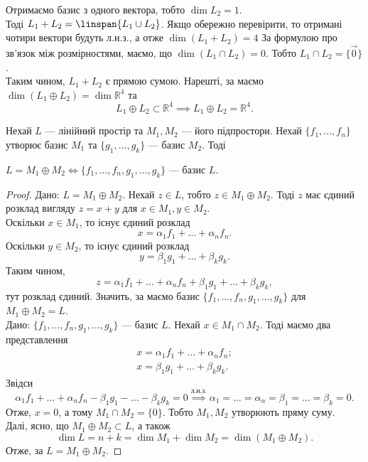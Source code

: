 \documentclass{math_library}
\begin{document}
\begin{example}
\[	\]
	Отримаємо базис з одного вектора, тобто $\dim L_2 = 1$.\\
	Тоді $L_1 + L_2 = \linspan\{L_1 \cup L_2\}$. Якщо обережно перевірити, то отримані чотири вектори будуть л.н.з., а отже $\dim (L_1 + L_2) = 4$ За формулою про зв'язок між розмірностями, маємо, що $\dim{(L_1 \cap L_2)} = 0$. Тобто $L_1 \cap L_2 = \{ \vec{0} \}$.\\
	Таким чином, $L_1 + L_2$ є прямою сумою. Нарешті, за  маємо $\dim{(L_1  \oplus  L_2)} = \dim {\mathbb{R}^4}$ та 
	\[
	L_1  \oplus  L_2 \subset \mathbb{R}^4 \implies L_1  \oplus  L_2 = \mathbb{R}^4.
	\]
	\end{example}
	
	\begin{theorem}
	\label{direct_sum_iff_union_of_bases_is_basis}
	Нехай $L$ --- лінійний простір та $M_1,M_2$ --- його підпростори. Нехай $\{f_1,\dots,f_n\}$ утворює базис $M_1$ та $\{g_1,\dots,g_k\}$ --- базис $M_2$. Тоді
	\begin{center}
	$L = M_1  \oplus  M_2 \iff \{f_1,\dots,f_n,g_1,\dots,g_k\}$ --- базис $L$.
	\end{center}
	\end{theorem}
	
	\begin{proof}
	\rightproof Дано: $L = M_1  \oplus  M_2$. Нехай $z \in L$, тобто $z \in M_1  \oplus  M_2$. Тоді $z$ має єдиний розклад вигляду $z = x+y$ для $x \in M_1, y \in M_2$.\\
	Оскільки $x \in M_1$, то існує єдиний розклад 
	\[
	x = \alpha_1 f_1 + \dots + \alpha_n f_n.
	\]
	Оскільки $y \in M_2$, то існує єдиний розклад
	\[
	y = \beta_1 g_1 + \dots + \beta_k g_k.
	\]
	Таким чином, 
	\[
	z = \alpha_1 f_1 + \dots + \alpha_n f_n + \beta_1 g_1 + \dots + \beta_k g_k,
	\]
	тут розклад єдиний. Значить, за  маємо базис $\{f_1,\dots,f_n,g_1,\dots,g_k\}$ для $M_1  \oplus  M_2 = L$. 
	\bigskip \\
	\leftproof Дано: $\{f_1,\dots,f_n,g_1,\dots,g_k\}$ --- базис $L$.
	Нехай $x \in M_1 \cap M_2$. Тоді маємо два представлення
	\begin{align*}
	x = \alpha_1 f_1 + \dots + \alpha_n f_n; \\
	x = \beta_1 g_1 + \dots + \beta_k g_k.
	\end{align*}
	Звідси 
	\[
	\alpha_1 f_1 + \dots + \alpha_n f_n - \beta_1 g_1 - \dots - \beta_k g_k = 0 \overset{\text{л.н.з.}}{\implies} \alpha_1 = \dots = \alpha_n = \beta_1 = \dots = \beta_k = 0.
	\]
	Отже, $x = 0$, а тому $M_1 \cap M_2 = \{0\}$. Тобто $M_1,M_2$ утворюють пряму суму.\\
	Далі, ясно, що $M_1  \oplus  M_2 \subset L$, а також 
	\[
	\dim L = n+k = \dim M_1 + \dim M_2 = \dim (M_1  \oplus  M_2).
	\]
	Отже, за  $L = M_1  \oplus  M_2$.
	\end{proof}
	
\end{document}
